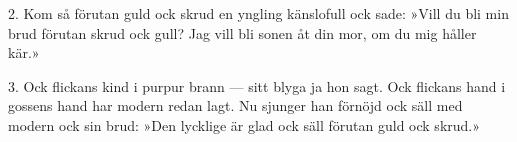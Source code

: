 \setlength{\columnsep}{0.5cm}
\begin{multicols}{2}
2.  Kom så förutan guld ock skrud
    en yngling känslofull
    ock sade: »Vill du bli min brud
    förutan skrud ock gull?
    Jag vill bli sonen åt din mor,
    om du mig håller kär.»
    \break
    \break

3.  Ock flickans kind i purpur brann ---
    sitt blyga ja hon sagt.
    Ock flickans hand i gossens hand
    har modern redan lagt.
    Nu sjunger han förnöjd ock säll
    med modern ock sin brud:
    »Den lycklige är glad ock säll
    förutan guld ock skrud.»
\end{multicols}
